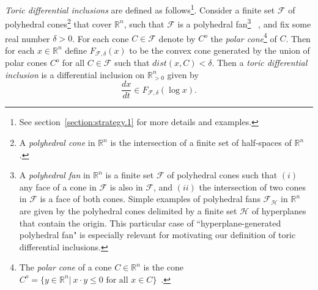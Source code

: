 \documentclass[12pt,letterpaper]{article}
\renewcommand{\H}{\mathcal{H}}
\newcommand{\F}{\mathcal{F}}
\newcommand{\RR}{\mathbb{R}}
\newcommand{\ZZ}{\mathbb{Z}}
\newcommand{\eps}{\varepsilon}
\begin{document}
{\em Toric differential inclusions} are defined as follows\footnote{See section~\ref{section:strategy.1} for more details and examples.}. Consider a finite set $\F$ of polyhedral cones\footnote{
A {\em polyhedral cone} in $\RR^n$ is the intersection of a finite set of half-spaces of $\RR^n$.
} that cover $\RR^n$, such that $\F$ is a polyhedral fan\footnote{
A {\em polyhedral fan} in $\RR^n$ is a finite set $\F$ of polyhedral cones such that $(i)$ any face of a cone in $\F$ is also in $\F$, and $(ii)$ the intersection of two cones in $\F$ is a face of both cones. 
Simple examples of polyhedral fans $\F_\H$ in $\RR^n$ are given by the polyhedral cones delimited by a finite set $\H$ of hyperplanes that contain the origin. This particular case of ``hyperplane-generated polyhedral fan" is especially relevant for motivating our definition of toric differential inclusions. 
} ~\cite{Cox_Little_Schenck_BOOK,Fulton}, and fix some real number $\delta>0$. For each cone $C\in \F$ denote by $C^o$ the {\em polar cone}\footnote{
The {\em polar cone} of a cone $C\in \RR^n$ is the cone $C^o = \{ y\in \RR^n | \ x \cdot y \le 0 \textrm{ for all } x\in C \}$~\cite{Rockafellar_Convex_Analysis}. 
}
of $C$. Then for each $x\in \RR^n$ define $F_{\F, \delta}(x)$ to be the convex cone generated by the union of polar cones $C^o$ for all $C\in\F$ such that $dist(x,C) < \delta$.
Then a {\em toric differential inclusion} is a differential inclusion on $\RR^n_{>0}$ given by 
%
\begin{equation}
\label{TDI_intro}
\frac{dx}{dt} \in F_{\F, \delta}(\log x). 
\end{equation}
%


\bigskip
\end{document}
